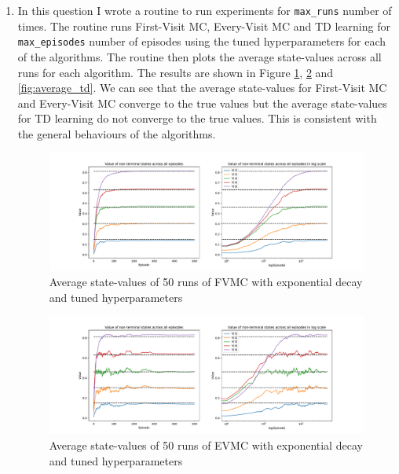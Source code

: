 \begin{enumerate}
    \item In this question I wrote a routine to run experiments for \texttt{max\_runs} number of times. The routine runs First-Visit MC, Every-Visit MC and TD learning for \texttt{max\_episodes} number of episodes using the tuned hyperparameters for each of the algorithms. The routine then plots the average state-values across all runs for each algorithm. The results are shown in Figure \ref{fig:average_fvmc}, \ref{fig:average_evmc} and \ref{fig:average_td}. We can see that the average state-values for First-Visit MC and Every-Visit MC converge to the true values but the average state-values for TD learning do not converge to the true values. This is consistent with the general behaviours of the algorithms.
    \begin{figure}[h]
        \centering
        \includegraphics[width=\textwidth]{images/mc_td/fvmc_experiments_50.pdf}
        \caption{Average state-values of 50 runs of FVMC with exponential decay and tuned hyperparameters}
        \label{fig:average_fvmc}
    \end{figure}

    \begin{figure}[h]
        \centering
        \includegraphics[width=\textwidth]{images/mc_td/evmc_experiments_50.pdf}
        \caption{Average state-values of 50 runs of EVMC with exponential decay and tuned hyperparameters}
        \label{fig:average_evmc}
    \end{figure}


\end{enumerate}
